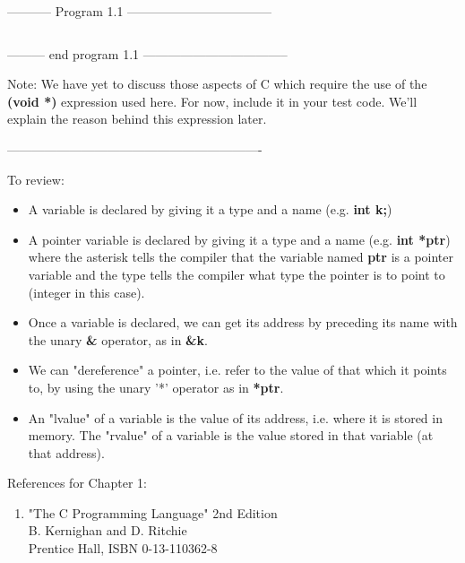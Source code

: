 -----------  Program 1.1  -----------------------------------
\inputminted{c}{../src/ch1-1.c}
--------- end program 1.1 -----------------------------------

Note: We have yet to discuss those aspects of C which require the use of
the \textbf{(void *)} expression used here. For now, include it in your
test code. We'll explain the reason behind this expression later.

-------------------------------------------------------------

To review:

\begin{itemize}
\tightlist
\item
  A variable is declared by giving it a type and a name (e.g.
  \textbf{int k;})
\item
  A pointer variable is declared by giving it a type and a name (e.g.
  \textbf{int *ptr}) where the asterisk tells the compiler that the
  variable named \textbf{ptr} is a pointer variable and the type tells
  the compiler what type the pointer is to point to (integer in this
  case).
\item
  Once a variable is declared, we can get its address by preceding its
  name with the unary \textbf{\&} operator, as in \textbf{\&k}.
\item
  We can "dereference" a pointer, i.e. refer to the value of that which
  it points to, by using the unary '*' operator as in \textbf{*ptr}.
\item
  An "lvalue" of a variable is the value of its address, i.e. where it
  is stored in memory. The "rvalue" of a variable is the value stored in
  that variable (at that address).
\end{itemize}

References for Chapter 1:

\begin{enumerate}
\tightlist
\item
  "The C Programming Language" 2nd Edition\\
  B. Kernighan and D. Ritchie\\
  Prentice Hall, ISBN 0-13-110362-8\\
\end{enumerate}

\begin{comment}
\href{ch2x.htm}{Chapter 2: Pointer Types and Arrays.}

\href{pointers.htm}{Back to Table of Contents}
\end{comment}

